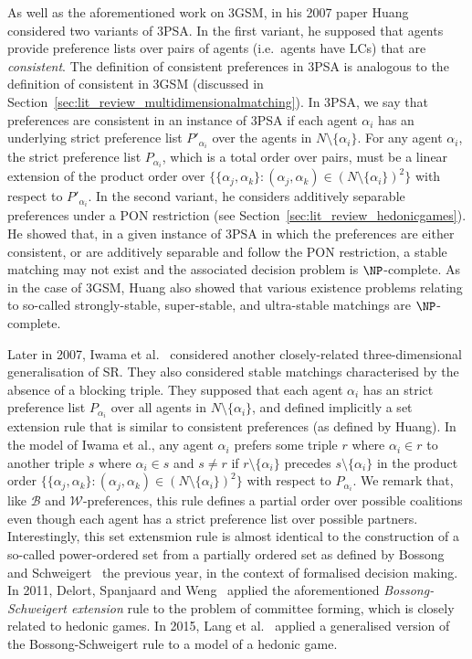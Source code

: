 As well as the aforementioned work on 3GSM, in his 2007 paper Huang \cite{Huang07conference} considered two variants of 3PSA. In the first variant, he supposed that agents provide preference lists over pairs of agents (i.e.\ agents have LCs) that are \emph{consistent}. The definition of consistent preferences in 3PSA is analogous to the definition of consistent in 3GSM (discussed in Section~\ref{sec:lit_review_multidimensionalmatching}). In 3PSA, we say that preferences are consistent in an instance of 3PSA if each agent $\alpha_i$ has an underlying strict preference list $P'_{\alpha_i}$ over the agents in $N\setminus \{ \alpha_i \}$. For any agent $\alpha_i$, the strict preference list $P_{\alpha_i}$, which is a total order over pairs, must be a linear extension of the product order over $\{ \{ \alpha_j, \alpha_k \} : (\alpha_j, \alpha_k) \in (N \setminus \{ \alpha_i \})^2 \}$ with respect to $P'_{\alpha_i}$. In the second variant, he considers additively separable preferences under a PON restriction (see Section~\ref{sec:lit_review_hedonicgames}). He showed that, in a given instance of 3PSA in which the preferences are either consistent, or are additively separable and follow the PON restriction, a stable matching may not exist and the associated decision problem is $\NP$-complete. As in the case of 3GSM, Huang also showed that various existence problems relating to so-called strongly-stable, super-stable, and ultra-stable matchings are $\NP$-complete.

Later in 2007, Iwama et al.~\cite{IMO07} considered another closely-related three-dimensional generalisation of SR. They also considered stable matchings characterised by the absence of a blocking triple. They supposed that each agent $\alpha_i$ has an strict preference list $P_{\alpha_i}$ over all agents in $N \setminus \{ \alpha_i \}$, and defined implicitly a set extension rule that is similar to consistent preferences (as defined by Huang). In the model of Iwama et al., any agent $\alpha_i$ prefers some triple $r$ where $\alpha_i \in r$ to another triple $s$ where $\alpha_i \in s$ and $s \neq r$ if $r \setminus \{ \alpha_i \}$ precedes $s \setminus \{ \alpha_i \}$ in the product order $\{ \{ \alpha_j, \alpha_k \} : (\alpha_j, \alpha_k) \in (N \setminus \{ \alpha_i \})^2 \}$ with respect to $P_{\alpha_i}$. We remark that, like $\mathscr{B}$ and $\mathscr{W}$-preferences, this rule defines a partial order over possible coalitions even though each agent has a strict preference list over possible partners. Interestingly, this set extensmion rule is almost identical to the construction of a so-called power-ordered set from a partially ordered set as defined by Bossong and Schweigert~\cite{Bossong2006} the previous year, in the context of formalised decision making. In 2011, Delort, Spanjaard and Weng~\cite{committeeselectiondelort} applied the aforementioned \emph{Bossong-Schweigert extension} rule to the problem of committee forming, which is closely related to hedonic games. In 2015, Lang et al.~\cite{LRRSS15} applied a generalised version of the Bossong-Schweigert rule to a model of a hedonic game.


